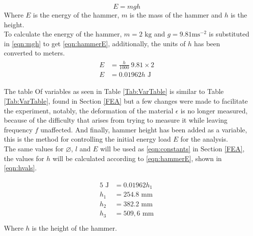 \documentclass[a4paper,12pt]{article}
\begin{document}
    \begin{equation}\label{eqn:mgh}
     E=mgh
    \end{equation}
    Where $E$ is the energy of the hammer, $m$ is the mass of the hammer and $h$ is the height.\\
    To calculate the energy of the hammer, $m=2\text{ kg}$ and $g=9.81\text{ms}^{-2}$ is substituted in \eqref{eqn:mgh} to get \eqref{eqn:hammerE}, additionally, the units of $h$ has been converted to meters.
    \begin{align}%
    \label{eqn:hammerE}
    \begin{split}
     E&=\frac{h}{1000}~9.81\times2\\
     E&=0.01962h \text{ J}
    \end{split}
    \end{align}

    The table Of variables as seen in  Table \ref{Tab:VarTable} is similar to Table \ref{Tab:VarTable}, found in Section \ref{FEA} but a few changes were made to facilitate the experiment, notably, the deformation of the material $\epsilon$ is no longer measured, because of the difficulty that arises from trying to measure it while leaving frequency $f$ unaffected. And finally, hammer height has been added as a variable, this is the method for controlling the initial energy load $E$ for the analysis.\\
    The same values for $\diameter$, $l$ and $E$ will be used as \eqref{eqn:constants} in Section \ref{FEA}, the values for $h$ will be calculated according to \eqref{eqn:hammerE}, shown in \eqref{eqn:hvals}.

    \begin{align}%
    \label{eqn:hvals}
    \begin{split}
     5 \text{ J}&=0.01962h_1\\
     h_1&=254.8\text{ mm}\\
     h_2&=382.2\text{ mm}\\
     h_3&=509,6\text{ mm}\\
    \end{split}
    \end{align}
    Where $h$ is the height of the hammer.
\end{document}
